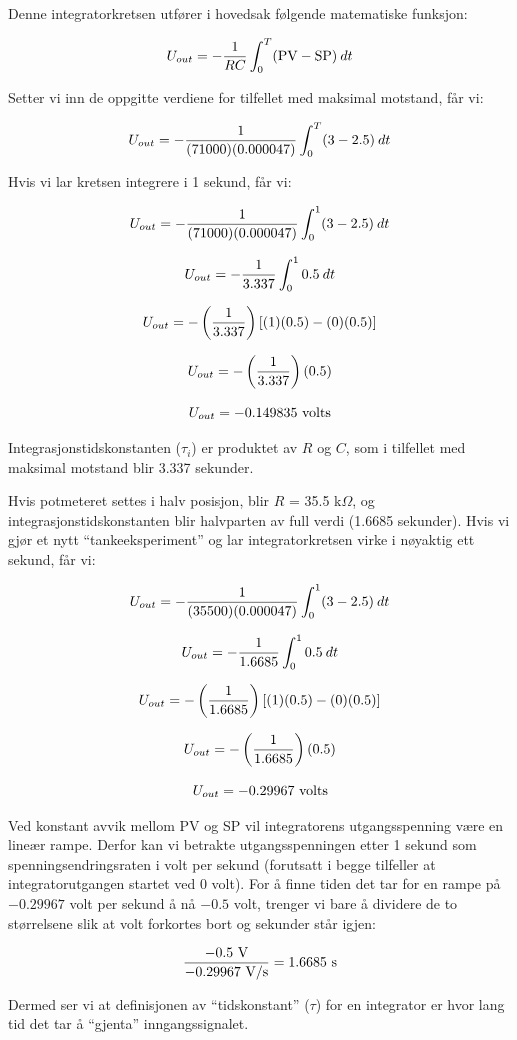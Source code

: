 





Denne integratorkretsen utfører i hovedsak følgende matematiske funksjon:

$$U_{out} = - {1 \over RC} \int_0^T (\hbox{PV} - \hbox{SP}) \> dt$$

Setter vi inn de oppgitte verdiene for tilfellet med maksimal motstand, får vi:

$$U_{out} = - {1 \over (71000)(0.000047)} \int_0^T (3 - 2.5) \> dt$$

Hvis vi lar kretsen integrere i 1 sekund, får vi:

$$U_{out} = - {1 \over (71000)(0.000047)} \int_0^1 (3 - 2.5) \> dt$$

$$U_{out} = - {1 \over 3.337} \int_0^1 0.5 \> dt$$

$$U_{out} = - \left({1 \over 3.337}\right) [(1)(0.5) - (0)(0.5)]$$

$$U_{out} = - \left({1 \over 3.337}\right) (0.5)$$

$$U_{out} = - 0.149835 \hbox{ volts}$$

Integrasjonstidskonstanten ($\tau_i$) er produktet av $R$ og $C$, som i tilfellet med maksimal motstand blir 3.337 sekunder.

\vskip 10pt

Hvis potmeteret settes i halv posisjon, blir $R$ = 35.5 k$\Omega$, og integrasjonstidskonstanten blir halvparten av full verdi (1.6685 sekunder). Hvis vi gjør et nytt ``tankeeksperiment'' og lar integratorkretsen virke i nøyaktig ett sekund, får vi:

$$U_{out} = - {1 \over (35500)(0.000047)} \int_0^1 (3 - 2.5) \> dt$$

$$U_{out} = - {1 \over 1.6685} \int_0^1 0.5 \> dt$$

$$U_{out} = - \left({1 \over 1.6685}\right) [(1)(0.5) - (0)(0.5)]$$

$$U_{out} = - \left({1 \over 1.6685}\right) (0.5)$$

$$U_{out} = - 0.29967 \hbox{ volts}$$

Ved konstant avvik mellom PV og SP vil integratorens utgangsspenning være en lineær rampe. Derfor kan vi betrakte utgangsspenningen etter 1 sekund som spenningsendringsraten i volt per sekund (forutsatt i begge tilfeller at integratorutgangen startet ved 0 volt). For å finne tiden det tar for en rampe på $-0.29967$ volt per sekund å nå $-0.5$ volt, trenger vi bare å dividere de to størrelsene slik at volt forkortes bort og sekunder står igjen:

$${-0.5 \hbox{ V} \over -0.29967 \hbox{ V/s}} = 1.6685 \hbox{ s}$$

Dermed ser vi at definisjonen av ``tidskonstant'' ($\tau$) for en integrator er hvor lang tid det tar å ``gjenta'' inngangssignalet.


